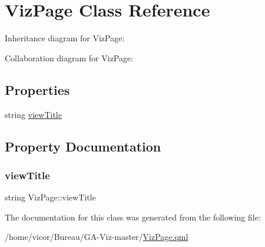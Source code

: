 \hypertarget{class_viz_page}{}\section{Viz\+Page Class Reference}
\label{class_viz_page}


Inheritance diagram for Viz\+Page\+:


Collaboration diagram for Viz\+Page\+:
\subsection*{Properties}
\begin{DoxyCompactItemize}
\item 
string \hyperlink{class_viz_page_ada47dcd65e8809b1f2d516e9e8fe947c}{view\+Title}
\end{DoxyCompactItemize}


\subsection{Property Documentation}
\mbox{\label{class_viz_page_ada47dcd65e8809b1f2d516e9e8fe947c}} 
\subsubsection{\texorpdfstring{view\+Title}{viewTitle}}
{\footnotesize\ttfamily string Viz\+Page\+::view\+Title}



The documentation for this class was generated from the following file\+:\begin{DoxyCompactItemize}
\item 
/home/vicor/\+Bureau/\+G\+A-\/\+Viz-\/master/\hyperlink{_viz_page_8qml}{Viz\+Page.\+qml}\end{DoxyCompactItemize}
